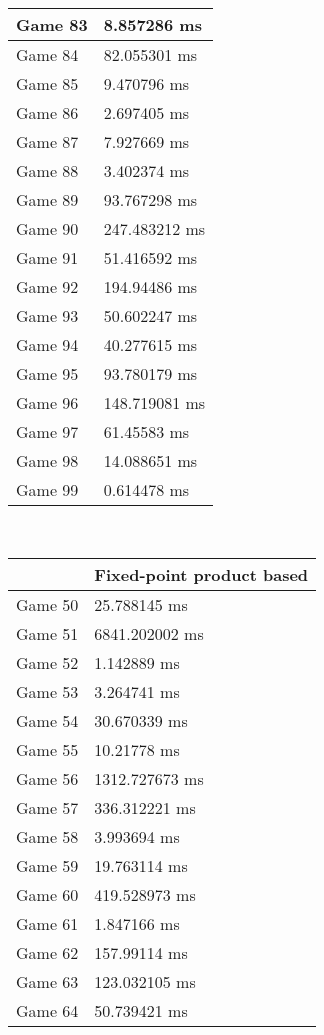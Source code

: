 \begin{multicols}{2}
\begin{tabular}{|l|l|}
	Game 83 & 8.857286 ms \\ \hline
	Game 84 & 82.055301 ms \\ \hline
	Game 85 & 9.470796 ms \\ \hline
	Game 86 & 2.697405 ms \\ \hline
	Game 87 & 7.927669 ms \\ \hline
	Game 88 & 3.402374 ms \\ \hline
	Game 89 & 93.767298 ms \\ \hline
	Game 90 & 247.483212 ms \\ \hline
	Game 91 & 51.416592 ms \\ \hline
	Game 92 & 194.94486 ms \\ \hline
	Game 93 & 50.602247 ms \\ \hline
	Game 94 & 40.277615 ms \\ \hline
	Game 95 & 93.780179 ms \\ \hline
	Game 96 & 148.719081 ms \\ \hline
	Game 97 & 61.45583 ms \\ \hline
	Game 98 & 14.088651 ms \\ \hline
	Game 99 & 0.614478 ms \\ \hline
\end{tabular}\\
\begin{tabular}{|l|l|}
	\hline
	& Fixed-point product based \\ \hline
	Game 50 & 25.788145 ms \\ \hline
	Game 51 & 6841.202002 ms \\ \hline
	Game 52 & 1.142889 ms \\ \hline
	Game 53 & 3.264741 ms \\ \hline
	Game 54 & 30.670339 ms \\ \hline
	Game 55 & 10.21778 ms \\ \hline
	Game 56 & 1312.727673 ms \\ \hline
	Game 57 & 336.312221 ms \\ \hline
	Game 58 & 3.993694 ms \\ \hline
	Game 59 & 19.763114 ms \\ \hline
	Game 60 & 419.528973 ms \\ \hline
	Game 61 & 1.847166 ms \\ \hline
	Game 62 & 157.99114 ms \\ \hline
	Game 63 & 123.032105 ms \\ \hline
	Game 64 & 50.739421 ms \\ \hline

\end{tabular}
\end{multicols}
